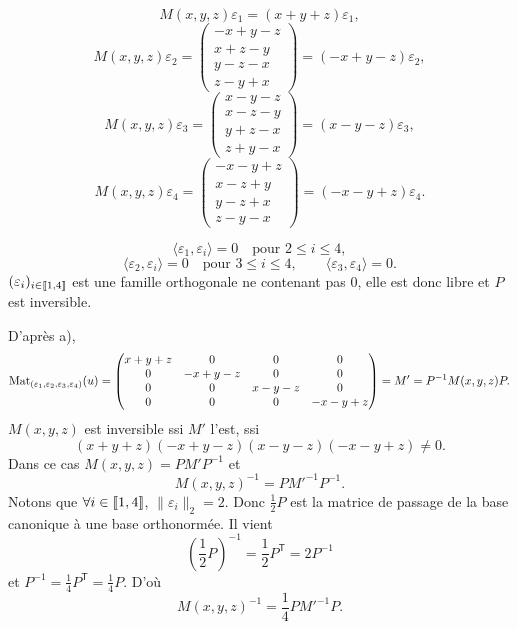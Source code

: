 \begin{solution}
\[
M(x,y,z)\varepsilon_1=(x+y+z)\varepsilon_1,
\]
\[
M(x,y,z)\varepsilon_2=
\begin{pmatrix}-x+y-z\\x+z-y\\y-z-x\\z-y+x\end{pmatrix}
=(-x+y-z)\varepsilon_2,
\]
\[
M(x,y,z)\varepsilon_3=
\begin{pmatrix}x-y-z\\x-z-y\\y+z-x\\z+y-x\end{pmatrix}
=(x-y-z)\varepsilon_3,
\]
\[
M(x,y,z)\varepsilon_4=
\begin{pmatrix}-x-y+z\\x-z+y\\y-z+x\\z-y-x\end{pmatrix}
=(-x-y+z)\varepsilon_4.
\]

\[
\langle\varepsilon_1,\varepsilon_i\rangle=0\quad\text{pour }2\leq i\leq4,
\]
\[
\langle\varepsilon_2,\varepsilon_i\rangle=0\quad\text{pour }3\leq i\leq4,
\qquad \langle\varepsilon_3,\varepsilon_4\rangle=0.
\]
$(\varepsilon_i)_{i\in\llbracket 1,4\rrbracket}$ est une famille orthogonale ne contenant pas
$0$, elle est donc libre et $P$ est inversible.

D'après a),
\[
\operatorname{Mat}_{(\varepsilon_1,\varepsilon_2,\varepsilon_3,\varepsilon_4)}(u)=
\begin{pmatrix}
x+y+z&0&0&0\\
0&-x+y-z&0&0\\
0&0&x-y-z&0\\
0&0&0&-x-y+z
\end{pmatrix}=M'= P^{-1}M(x,y,z)P.
\]
$M(x,y,z)$ est inversible ssi $M'$ l'est, ssi
\[
(x+y+z)(-x+y-z)(x-y-z)(-x-y+z)\neq0.
\]
Dans ce cas $M(x,y,z)=PM'P^{-1}$ et
\[
M(x,y,z)^{-1}=PM'^{-1}P^{-1}.
\]
Notons que $\forall i\in\llbracket 1,4\rrbracket$, $\|\varepsilon_i\|_2=2$. Donc
$\frac12P$ est la matrice de passage de la base canonique à une base orthonormée. Il vient
\[
\left(\frac12P\right)^{-1}=\frac12P^{\mathsf T}=2P^{-1}
\]
et $P^{-1}=\frac14P^{\mathsf T}=\frac14P$. D'où
\[
\boxed{M(x,y,z)^{-1}=\frac14PM'^{-1}P.}
\]
\end{solution}


